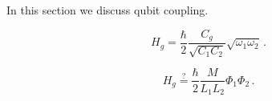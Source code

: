  \label{sec:qubits:coupling}

In this section we discuss qubit coupling.


\begin{equation}
H_g = \frac{\hbar}{2} \frac{C_g}{\sqrt{C_1 C_2}} \sqrt{\omega_1 \omega_2} \, .
\end{equation}


\begin{equation}
H_g \stackrel{?}{=} \frac{\hbar}{2} \frac{M}{L_1 L_2} \Phi_1 \Phi_2 \, .
\end{equation}
